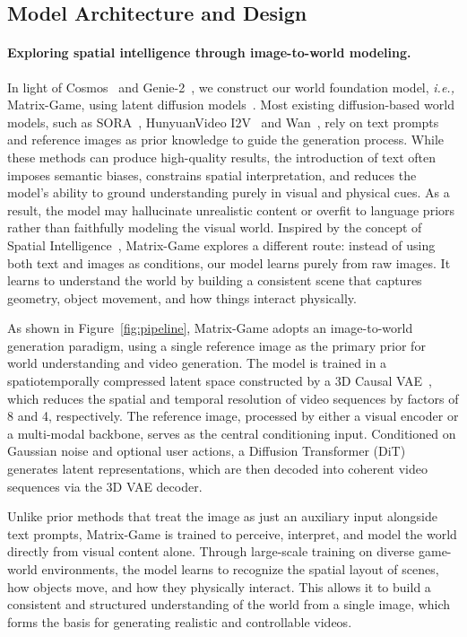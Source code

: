 \documentclass{article}
\def\ie{\emph{i.e., }}
\begin{document}
 

\subsection{Model Architecture and Design}  

\paragraph{Exploring spatial intelligence through image-to-world modeling.}
In light of Cosmos~\cite{agarwal2025cosmos} and Genie-2~\cite{parkerholder2024genie2}, we construct our world foundation model, \ie Matrix-Game, using latent diffusion models~\cite{rombach2022high}. Most existing diffusion-based world models, such as SORA~\cite{openai2024worldsim}, HunyuanVideo I2V~\cite{kong2024hunyuanvideo} and Wan~\cite{wang2025wan}, rely on text prompts and reference images as prior knowledge to guide the generation process. While these methods can produce high-quality results, the introduction of text often imposes semantic biases, constrains spatial interpretation, and reduces the model’s ability to ground understanding purely in visual and physical cues. As a result, the model may hallucinate unrealistic content or overfit to language priors rather than faithfully modeling the visual world. Inspired by the concept of Spatial Intelligence~\cite{worldlabs2025generating}, Matrix-Game explores a different route: instead of using both text and images as conditions, our model learns purely from raw images. It learns to understand the world by building a consistent scene that captures geometry, object movement, and how things interact physically. 

As shown in Figure~\ref{fig:pipeline}, Matrix-Game adopts an image-to-world generation paradigm, using a single reference image as the primary prior for world understanding and video generation. The model is trained in a spatiotemporally compressed latent space constructed by a 3D Causal VAE~\cite{kingma2013auto,yu2023language}, which reduces the spatial and temporal resolution of video sequences by factors of 8 and 4, respectively. The reference image, processed by either a visual encoder or a multi-modal backbone, serves as the central conditioning input. Conditioned on Gaussian noise and optional user actions, a Diffusion Transformer (DiT) generates latent representations, which are then decoded into coherent video sequences via the 3D VAE decoder.

Unlike prior methods that treat the image as just an auxiliary input alongside text prompts, Matrix-Game is trained to perceive, interpret, and model the world directly from visual content alone. Through large-scale training on diverse game-world environments, the model learns to recognize the spatial layout of scenes, how objects move, and how they physically interact. This allows it to build a consistent and structured understanding of the world from a single image, which forms the basis for generating realistic and controllable videos. 
\end{document}
